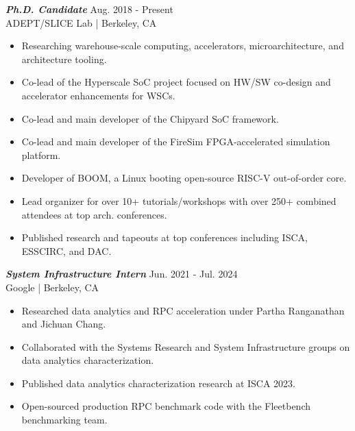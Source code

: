 \documentclass[letter]{res}
\begin{document}
\begin{resume}
{\sl \textbf{Ph.D. Candidate}} \hfill Aug. 2018 - Present\\
ADEPT/SLICE Lab | Berkeley, CA \newline

 \vspace{-4mm}

 \begin{itemize}
 \item Researching warehouse-scale computing, accelerators, microarchitecture, and architecture tooling.
 \item Co-lead of the Hyperscale SoC project focused on HW/SW co-design and accelerator enhancements for WSCs.
 \item Co-lead and main developer of the Chipyard SoC framework.
 \item Co-lead and main developer of the FireSim FPGA-accelerated simulation platform.
 \item Developer of BOOM, a Linux booting open-source RISC-V out-of-order core.
 \item Lead organizer for over 10+ tutorials/workshops with over 250+ combined attendees at top arch. conferences.
 \item Published research and tapeouts at top conferences including ISCA, ESSCIRC, and DAC.
 \end{itemize}

\vspace{-2mm}

{\sl \textbf{System Infrastructure Intern}} \hfill Jun. 2021 - Jul. 2024\\
Google | Berkeley, CA \newline

 \vspace{-4mm}

 \begin{itemize}
 \item Researched data analytics and RPC acceleration under Partha Ranganathan and Jichuan Chang.
 \item Collaborated with the Systems Research and System Infrastructure groups on data analytics characterization.
 \item Published data analytics characterization research at ISCA 2023.
 \item Open-sourced production RPC benchmark code with the Fleetbench benchmarking team.
 \end{itemize}

\vspace{-2mm}


\end{resume}
\end{document}
